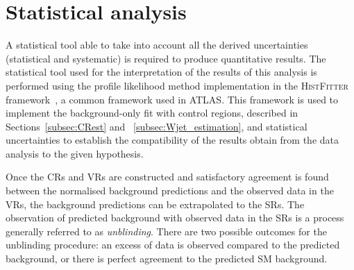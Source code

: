 	\section{Statistical analysis}
	\label{sec:stat_ana}
	A statistical tool able to take into account all the derived uncertainties (statistical and systematic) is required to produce quantitative results. The statistical tool used for the interpretation of the results of this analysis is performed using the profile likelihood method implementation in the \textsc{HistFitter} framework~\cite{histfitter}, a common framework used in \ac{ATLAS}. 
	This framework is used to implement the background-only fit with control regions, described in Sections~\ref{subsec:CRest} and ~\ref{subsec:Wjet_estimation}, and statistical uncertainties to establish the compatibility of the results obtain from the data analysis to the given hypothesis. 

	Once the \acp{CR} and \acp{VR} are constructed and satisfactory agreement is found between the normalised background predictions and the observed data in the \acp{VR}, the background predictions can be extrapolated to the \acp{SR}. The observation of predicted background with observed data in the \acp{SR} is a process generally referred to as \textit{unblinding}. There are two possible outcomes for the unblinding procedure: an excess of data is observed compared to the predicted background, or there is perfect agreement to the predicted \ac{SM} background. 
